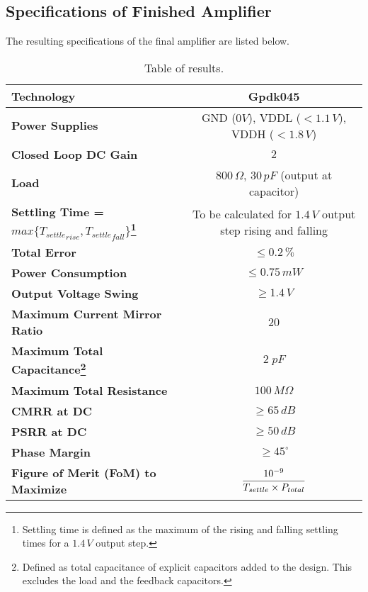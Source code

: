 \documentclass[12pt, fleqn]{article}
\begin{document}
\subsection{Specifications of Finished Amplifier}
    The resulting specifications of the final amplifier are listed below.\\[0.5cm]
    \begin{table}[H]
        \centering
        \setlength{\tabcolsep}{4pt}
        \renewcommand{\arraystretch}{2}
        \begin{tabular}{|l|c|}
            \hline
            \textbf{Technology} & Gpdk045\\
            \hline
            \textbf{Power Supplies} & GND ($0V$), VDDL ($< 1.1\,V$), VDDH ($< 1.8\,V$)\\
            \hline
            \textbf{Closed Loop DC Gain} & $2$\\
            \hline
            \textbf{Load} & $800\,\Omega$, $30\,pF$ (output at capacitor)\\
            \hline
            \textbf{Settling Time = $max\{{T_{settle}}_{rise}, {T_{settle}}_{fall}\}$\footnote{Settling time is defined as the maximum of the rising and falling settling times for a $1.4\,V$ output step.}} & To be calculated for $1.4\,V$ output step rising and falling\\
            \hline
            \textbf{Total Error} & $\leq 0.2\,\%$\\
            \hline
            \textbf{Power Consumption} & $\leq 0.75\,mW$\\
            \hline
            \textbf{Output Voltage Swing} & $\geq 1.4\,V$\\
            \hline
            \textbf{Maximum Current Mirror Ratio} & $20$\\
            \hline
            \textbf{Maximum Total Capacitance\footnote{Defined as total capacitance of explicit capacitors added to the design. This excludes the load and the feedback capacitors.}} & $2\;pF$\\
            \hline
            \textbf{Maximum Total Resistance} & $100\,M\Omega$\\
            \hline
            \textbf{CMRR at DC} & $\geq 65\,dB$\\
            \hline
            \textbf{PSRR at DC} & $\geq 50\,dB$\\
            \hline
            \textbf{Phase Margin} & $\geq {45}^\circ$\\
            \hline
            \textbf{Figure of Merit (FoM) to Maximize} & $\mathlarger{\frac{{10}^{-9}}{T_{settle} \times P_{total}}}$\\
            \hline
        \end{tabular}
        \caption{Table of results.
        \label{tab:specs2}} 
    \end{table}
\newpage
\end{document}
